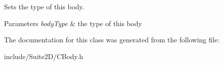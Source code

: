 Sets the type of this body.


\begin{DoxyParams}{Parameters}
{\em body\+Type} & the type of this body \\
\hline
\end{DoxyParams}


The documentation for this class was generated from the following file\+:\begin{DoxyCompactItemize}
\item 
include/\+Suite2\+D/C\+Body.\+h\end{DoxyCompactItemize}
